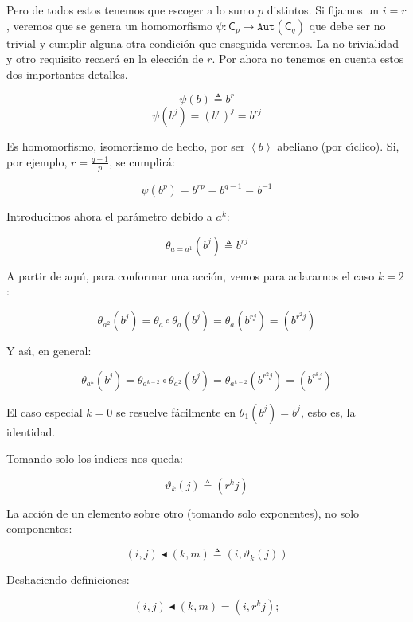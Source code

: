 \documentclass[final,12pt,a4paper,twoside,fleqn]{extbook}
\theoremstyle{definition}
\theoremstyle{remark}
\begin{document}
Pero de todos estos tenemos que escoger a lo sumo $p$ distintos. Si fijamos un $i=r$, veremos que se genera un homomorfismo ${\psi } : {{\mathsf{C}}_{p}}            \longrightarrow            {{\mathtt{Aut}}{\left({{\mathsf{C}}_{q}}\right)}}$ que debe ser no trivial y cumplir alguna otra condici\'on que enseguida veremos. La no trivialidad y otro requisito recaer\'a en la elecci\'on de $r$. Por ahora no tenemos en cuenta estos dos importantes detalles.

\[
  {\psi }{\left({b}\right)}\triangleq {b^r}
\]
\[
  {\psi }{\left({b^j}\right)}={ {\left({b^r}\right)}^j}=b^{rj}
\]

Es homomorfismo, isomorfismo de hecho, por ser $\left\langle b \right\rangle$ abeliano (por c{\'{\i}}clico).
Si, por ejemplo, $r=\frac{q-1}{p}$, se cumplir\'a:

\[
  {\psi }{\left({b^p}\right)}=b^{rp}=b^{q-1}=b^{-1}
\]

Introducimos ahora el par\'ametro debido a $a^k$:

\[
  {{\theta }_{a=a^1}}{\left({b^j}\right)} \triangleq b^{rj}
\]

A partir de aqu{\'{\i}}, para conformar una acci\'on, vemos para aclararnos el caso $k=2$ :

\[
  {{\theta }_{a^2}}{\left({b^j}\right)}=
  {{\theta }_{a}}            \circ {{\theta }_{a}}{\left({b^j}\right)}=
  {{\theta }_{a}}{\left({b^{rj}}\right)}={\left({b^{r^2 j}}\right)}
\]

Y as{\'{\i}},  en general:

\[
  {{\theta }_{a^k}}{\left({b^j}\right)} =
  {{\theta }_{a^{k-2}}}            \circ {{\theta }_{a^2}}{\left({b^j}\right)}=
  {{\theta }_{a^{k-2}}}{\left({b^{r^2j}}\right)}=
  {\left({b^{r^kj}}\right)}
\]

El caso especial $k=0$ se resuelve f\'acilmente en ${\theta }_{1}{\left({b^j}\right)}=b^j$, esto es, la identidad.

Tomando solo los {\'{\i}}ndices nos queda:

\[
  {{\vartheta }_{k}}{\left({j}\right)} \triangleq  {\left({r^kj}\right)}
\]

La acci\'on de un elemento sobre otro (tomando solo exponentes), no solo componentes:

\[
(i,j)\blacktriangleleft(k,m)\triangleq{(i,{{\vartheta }_{k}}{\left({j}\right)})}
\]

Deshaciendo definiciones:

\[
(i,j)\blacktriangleleft(k,m)=(i,r^k j);
\]
\end{document}
